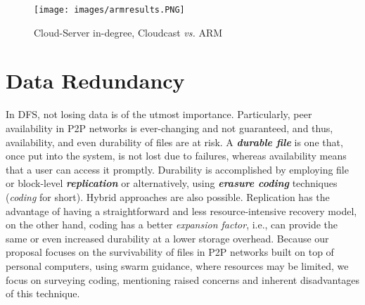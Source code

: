 \documentclass[runningheads]{llncs}
\begin{document}
\begin{figure}[!ht]
\centering
\texttt{[image: images/armresults.PNG]}
\caption{Cloud-Server in-degree, Cloudcast \textit{vs.} ARM}
\label{fig:arm_results}
\end{figure}

\section{Data Redundancy}\label{sec:dataredundancy}
In DFS, not losing data is of the utmost importance. Particularly, peer availability in P2P networks is ever-changing and not guaranteed, and thus, availability, and even durability of files are at risk. A \textbf{\textit{durable file}} is one that, once put into the system, is not lost due to failures, whereas availability means that a user can access it promptly. Durability is accomplished by employing file or block-level \textbf{\textit{replication}} or alternatively, using \textbf{\textit{erasure coding}} techniques (\textit{coding} for short). Hybrid approaches are also possible. Replication has the advantage of having a straightforward and less resource-intensive recovery model, on the other hand, coding has a better \textit{expansion factor}, i.e., can provide the same or even increased durability at a lower storage overhead. Because our proposal focuses on the survivability of files in P2P networks built on top of personal computers, using swarm guidance, where resources may be limited, we focus on surveying coding, mentioning raised concerns and inherent disadvantages of this technique.
\end{document}

